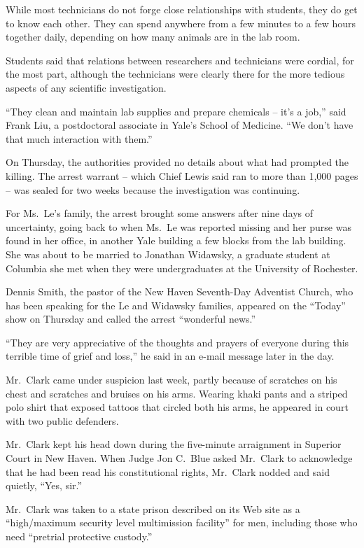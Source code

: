 ﻿\documentclass[12pt]{article}
\begin{document}
While most technicians do not forge close relationships with students, they do get to know each
other. They can spend anywhere from a few minutes to a few hours together daily, depending on how
many animals are in the lab room.

Students said that relations between researchers and technicians were cordial\cite{cordial}, for the
most part, although the technicians were clearly there for the more tedious aspects of any
scientific investigation.

``They clean and maintain lab supplies and prepare chemicals -- it's a job,'' said Frank Liu, a
postdoctoral associate in Yale's School of Medicine. ``We don't have that much interaction with
them.''

On Thursday, the authorities provided no details about what had prompted the killing. The arrest
warrant -- which Chief Lewis said ran to more than 1,000 pages -- was sealed for two weeks because
the investigation was continuing.

For Ms.~Le's family, the arrest brought some answers after nine days of uncertainty, going back to
when Ms.~Le was reported missing and her purse was found in her office, in another Yale building a
few blocks from the lab building. She was about to be married to Jonathan Widawsky, a graduate
student at Columbia she met when they were undergraduates at the University of Rochester.

Dennis Smith, the pastor\cite{pastor} of the New Haven Seventh-Day Adventist Church, who has been
speaking for the Le and Widawsky families, appeared on the ``Today'' show on Thursday and called the
arrest ``wonderful news.''

``They are very appreciative of the thoughts and prayers of everyone during this terrible time of
grief and loss,'' he said in an e-mail message later in the day.

Mr.~Clark came under suspicion last week, partly because of scratches on his chest and scratches and
bruises\cite{bruise} on his arms. Wearing khaki pants and a striped polo shirt that exposed tattoos
that circled both his arms, he appeared in court with two public defenders.

Mr.~Clark kept his head down during the five-minute arraignment in Superior Court in New Haven. When
Judge Jon C.~Blue asked Mr.~Clark to acknowledge that he had been read his constitutional rights,
Mr.~Clark nodded and said quietly, ``Yes, sir.''

Mr.~Clark was taken to a state prison described on its Web site as a ``high/maximum security level
multimission facility'' for men, including those who need ``pretrial protective custody.''
\end{document}
